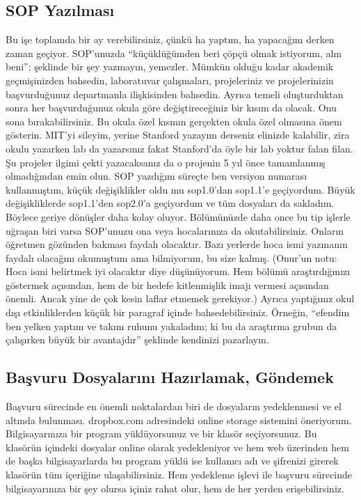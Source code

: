 \documentclass[12pt]{article}
\begin{document}
\subsection{SOP Yazılması}
Bu işe toplamda bir ay verebilirsiniz, çünkü ha yaptım, ha yapacağım derken zaman geçiyor. SOP'unuzda ``küçüklüğümden beri çöpçü olmak istiyorum, alın beni''; şeklinde bir şey yazmayın, yemezler. Mümkün olduğu kadar akademik geçmişinizden bahsedin, laboratuvar çalışmaları, projeleriniz ve projelerinizin başvurduğunuz departmanla ilişkisinden bahsedin. Ayrıca temeli oluşturduktan sonra her başvurduğunuz okula göre değiştireceğiniz bir kısım da olacak. Onu sona bırakabilirsiniz. Bu okula özel kısmın gerçekten okula özel olmasına önem gösterin. MIT'yi sileyim, yerine Stanford yazayım derseniz elinizde kalabilir, zira okulu yazarken lab da yazarsınız fakat Stanford'da öyle bir lab yoktur falan filan. Şu projeler ilgimi çekti yazacaksanız da o projenin 5 yıl önce tamamlanmış olmadığından emin olun. SOP yazdığım süreçte ben versiyon numarası kullanmıştım, küçük değişiklikler oldu mu sop1.0’dan sop1.1’e geçiyordum. Büyük değişikliklerde sop1.1’den sop2.0’a geçiyordum ve tüm dosyaları da sakladım. Böylece geriye dönüşler daha kolay oluyor. Bölümünüzde daha once bu tip işlerle uğraşan biri varsa SOP'unuzu ona veya hocalarınıza da okutabilirsiniz. Onların öğretmen gözünden bakması faydalı olacaktır. Bazı yerlerde hoca ismi yazmanın faydalı olacağını okumuştum ama bilmiyorum, bu size kalmış. (Onur'un notu: Hoca ismi belirtmek iyi olacaktır diye düşünüyorum. Hem bölümü araştırdığınızı göstermek açısından, hem de bir hedefe kitlenmişlik imajı vermesi açısından önemli. Ancak yine de çok kesin laflar etmemek gerekiyor.) Ayrıca yaptığınız okul dışı etkinliklerden küçük bir paragraf içinde bahsedebilirsiniz. Örneğin, ``efendim ben yelken yaptım ve takım ruhunu yakaladım; ki bu da araştırma grubun da çalışırken büyük bir avantajdır'' şeklinde  kendinizi pazarlayın. 

\subsection{Başvuru Dosyalarını Hazırlamak, Göndemek}
Başvuru sürecinde en önemli noktalardan biri de dosyaların yedeklenmesi ve el altında bulunması. dropbox.com adresindeki online storage sistemini öneriyorum. Bilgisayarınıza bir program yüklüyorsunuz ve bir klasör seçiyorsunuz. Bu klasörün içindeki dosyalar online olarak yedekleniyor ve hem web üzerinden hem de başka bilgisayarlarda bu program yüklü ise kullanıcı adı ve şifrenizi girerek klasörün tüm içeriğine ulaşabilirsiniz. Hem yedekleme işlevi ile başvuru sürecinde bilgisayarınıza bir şey olursa içiniz rahat olur, hem de her yerden erişebilirsiniz. 
\end{document}
